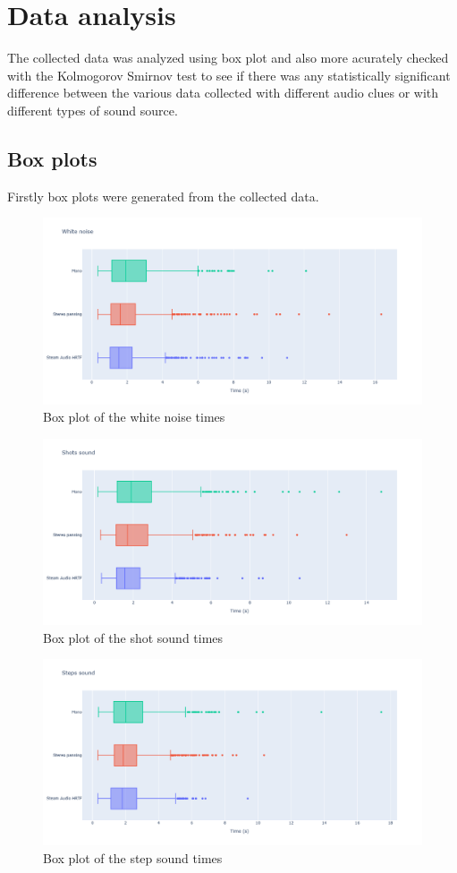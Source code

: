 \documentclass[conference]{IEEEtran}
\begin{document}
\section{Data analysis}
The collected data was analyzed using box plot and also more acurately checked with the Kolmogorov Smirnov test to see if there was any statistically significant difference between the various data collected with different audio clues or with different types of sound source.

\subsection{Box plots}
Firstly box plots were generated from the collected data.
\begin{figure}[htbp]
\centerline{\includegraphics[scale=0.22]{white_time.png}}
\caption{Box plot of the white noise times}
\label{fig3}
\end{figure}
\begin{figure}[htbp]
\centerline{\includegraphics[scale=0.22]{shot_time.png}}
\caption{Box plot of the shot sound times}
\label{fig4}
\end{figure}
\begin{figure}[htbp]
\centerline{\includegraphics[scale=0.22]{step_time.png}}
\caption{Box plot of the step sound times}
\label{fig5}
\end{figure}
\end{document}
